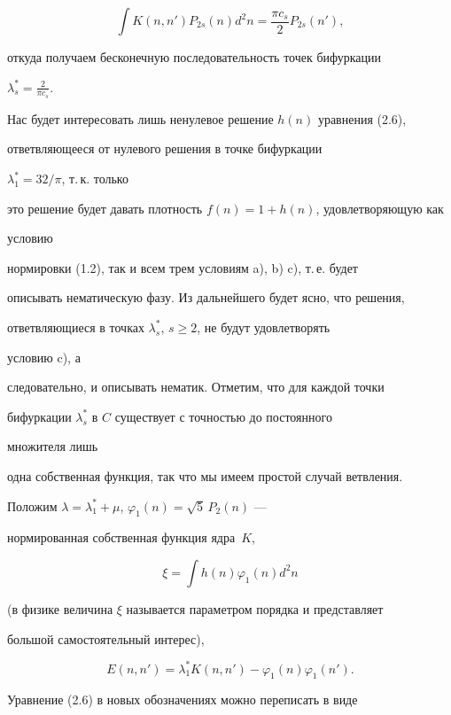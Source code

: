 \begin{equation}


\int K(n,n')P_{2s}(n)d^2n=\frac{\pi c_s}{2}P_{2s}(n'),


\tag{2.8}


\end{equation}


откуда получаем бесконечную последовательность точек бифуркации


$\lambda^*_s=\frac{2}{\pi c_s}$.





Нас будет интересовать лишь ненулевое решение $h(n)$ уравнения (2.6),


ответвляющееся от нулевого решения в точке бифуркации


$\lambda^*_1=32/\pi$, т.\,к. только


это решение будет давать плотность $f(n)=1+h(n)$, удовлетворяющую как


условию


нормировки (1.2), так и всем трем условиям a), b) c), т.\,е. будет


описывать нематическую фазу. Из дальнейшего будет ясно, что решения,


ответвляющиеся в точках $\lambda^*_s$, $s\ge 2$, не будут удовлетворять


условию c), а


следовательно, и описывать нематик. Отметим, что для каждой точки


бифуркации $\lambda^*_s$ в $C$ существует с точностью до постоянного


множителя лишь


одна собственная функция, так что мы имеем простой случай ветвления.


Положим $\lambda=\lambda^*_1+\mu$, $\varphi_1(n)=\sqrt{5}\,P_2(n)$ ---


нормированная собственная функция ядра~$K$,


$$


\xi=\int h(n)\varphi_1(n)d^2n


$$


(в физике величина $\xi$ называется параметром порядка и представляет


большой самостоятельный интерес),


$$


E(n,n')=\lambda^*_1 K(n,n')-\varphi_1(n)\varphi_1(n').


$$


Уравнение (2.6) в новых обозначениях можно переписать в виде


